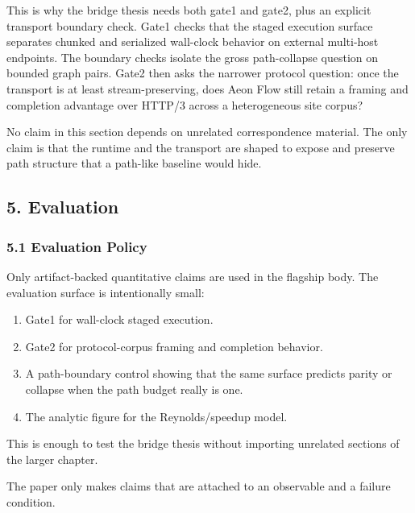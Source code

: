 \documentclass[
  11pt,
]{article}
\providecommand{\tightlist}{%
  \setlength{\itemsep}{0pt}\setlength{\parskip}{0pt}}
\begin{document}
This is why the bridge thesis needs both gate1 and gate2, plus an
explicit transport boundary check. Gate1 checks that the staged
execution surface separates chunked and serialized wall-clock behavior
on external multi-host endpoints. The boundary checks isolate the gross
path-collapse question on bounded graph pairs. Gate2 then asks the
narrower protocol question: once the transport is at least
stream-preserving, does Aeon Flow still retain a framing and completion
advantage over HTTP/3 across a heterogeneous site corpus?

No claim in this section depends on unrelated correspondence material.
The only claim is that the runtime and the transport are shaped to
expose and preserve path structure that a path-like baseline would hide.

\subsection{5. Evaluation}\label{evaluation}

\subsubsection{5.1 Evaluation Policy}\label{evaluation-policy}

Only artifact-backed quantitative claims are used in the flagship body.
The evaluation surface is intentionally small:

\begin{enumerate}
\def\labelenumi{\arabic{enumi}.}
\tightlist
\item
  Gate1 for wall-clock staged execution.
\item
  Gate2 for protocol-corpus framing and completion behavior.
\item
  A path-boundary control showing that the same surface predicts parity
  or collapse when the path budget really is one.
\item
  The analytic figure for the Reynolds/speedup model.
\end{enumerate}

This is enough to test the bridge thesis without importing unrelated
sections of the larger chapter.

The paper only makes claims that are attached to an observable and a
failure condition.
\end{document}
